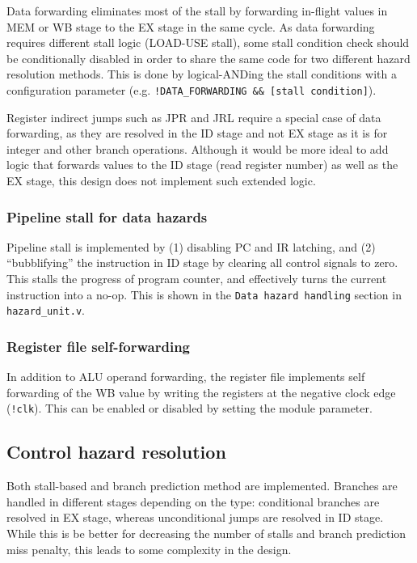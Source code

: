 \documentclass[12pt]{article}
\begin{document}
Data forwarding eliminates most of the stall by forwarding in-flight
values in MEM or WB stage to the EX stage in the same cycle.  As data
forwarding requires different stall logic (LOAD-USE stall), some stall
condition check should be conditionally disabled in order to share the
same code for two different hazard resolution methods. This is done by
logical-ANDing the stall conditions with a configuration parameter
(e.g.  \verb|!DATA_FORWARDING && [stall condition]|).

Register indirect jumps such as JPR and JRL require a special case of
data forwarding, as they are resolved in the ID stage and not EX stage
as it is for integer and other branch operations.  Although it would
be more ideal to add logic that forwards values to the ID stage (read
register number) as well as the EX stage, this design does not
implement such extended logic.

\subsubsection{Pipeline stall for data hazards}
Pipeline stall is implemented by (1) disabling PC and IR latching, and
(2) ``bubblifying'' the instruction in ID stage by clearing all
control signals to zero.  This stalls the progress of program counter,
and effectively turns the current instruction into a no-op.  This is
shown in the \texttt{Data hazard handling} section in
\verb|hazard_unit.v|.

\subsubsection{Register file self-forwarding}
In addition to ALU operand forwarding, the register file implements
self forwarding of the WB value by writing the registers at the
negative clock edge (\verb|!clk|).  This can be enabled or disabled by
setting the module parameter.

\subsection{Control hazard resolution}
Both stall-based and branch prediction method are implemented.
Branches are handled in different stages depending on the type:
conditional branches are resolved in EX stage, whereas unconditional
jumps are resolved in ID stage.  While this is be better for
decreasing the number of stalls and branch prediction miss penalty,
this leads to some complexity in the design.
\end{document}
